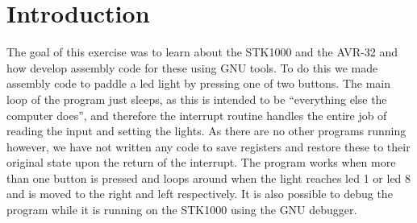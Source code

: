 \section{Introduction}
The goal of this exercise was to learn about the STK1000 and the AVR-32 and how develop assembly code for these using GNU tools. To do this we made assembly code to paddle a led light by pressing one of two buttons. The main loop of the program just sleeps, as this is intended to be “everything else the computer does”, and therefore the interrupt routine handles the entire job of reading the input and setting the lights. As there are no other programs running however, we have not written any code to save registers and restore these to their original state upon the return of the interrupt. The program works when more than one button is pressed and loops around when the light reaches led 1 or led 8 and is moved to the right and left respectively. It is also possible to debug the program while it is running on the STK1000 using the GNU debugger.

